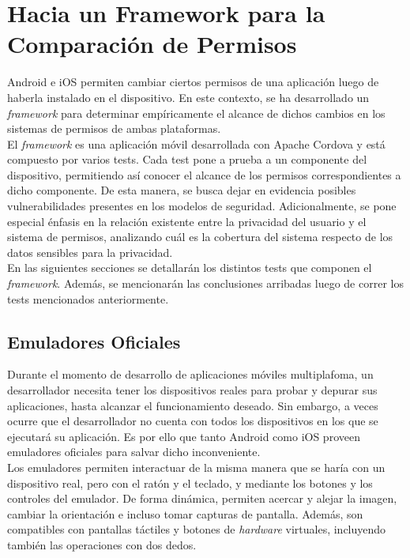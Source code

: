 \chapter{Hacia un Framework para la Comparación de Permisos}
Android e iOS permiten cambiar ciertos permisos de una aplicación luego de haberla instalado en el dispositivo. En este contexto, se ha desarrollado un \textit{framework} para determinar empíricamente el alcance de dichos cambios en los sistemas de permisos de ambas plataformas.\\

El \textit{framework} es una aplicación móvil desarrollada con Apache Cordova y está compuesto por varios tests. Cada test pone a prueba a un componente del dispositivo, permitiendo así conocer el alcance de los permisos correspondientes a dicho componente. De esta manera, se busca dejar en evidencia posibles vulnerabilidades presentes en los modelos de seguridad. Adicionalmente, se pone especial énfasis en la relación existente entre la privacidad del usuario y el sistema de permisos, analizando cuál es la cobertura del sistema respecto de los datos sensibles para la privacidad.\\

En las siguientes secciones se detallarán los distintos tests que componen el \textit{framework}. Además, se mencionarán las conclusiones arribadas luego de correr los tests mencionados anteriormente.
\section{Emuladores Oficiales}
Durante el momento de desarrollo de aplicaciones móviles multiplafoma, un desarrollador necesita tener los dispositivos reales para probar y depurar sus aplicaciones, hasta alcanzar el funcionamiento deseado. Sin embargo, a veces ocurre que el desarrollador no cuenta con todos los dispositivos en los que se ejecutará su aplicación. Es por ello que tanto Android como iOS proveen emuladores oficiales para salvar dicho inconveniente.\\

Los emuladores permiten interactuar de la misma manera que se haría con un dispositivo real, pero con el ratón y el teclado, y mediante los botones y los controles del emulador. De forma dinámica, permiten acercar y alejar la imagen, cambiar la orientación e incluso tomar capturas de pantalla. Además, son compatibles con pantallas táctiles y botones de \emph{hardware} virtuales, incluyendo también las operaciones con dos dedos.\\

